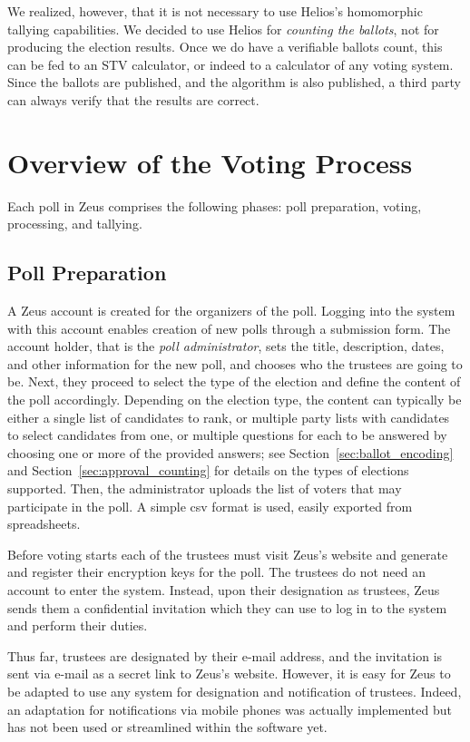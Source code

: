 \documentclass[letterpaper,10pt]{article}
\begin{document}
We realized, however, that it is not necessary to use Helios's
homomorphic tallying capabilities. We decided to use Helios for
\emph{counting the ballots}, not for producing the election results.
Once we do have a verifiable ballots count, this can be fed to an STV
calculator, or indeed to a calculator of any voting system. Since the
ballots are published, and the algorithm is also published, a third
party can always verify that the results are correct.

\section{Overview of the Voting Process}
\label{sec:voting_overview}

Each poll in Zeus comprises the following phases:
poll preparation, voting, processing, and tallying.

\subsection{Poll Preparation}
A Zeus account is created for the organizers of the poll.
Logging into the system with this account enables creation of new polls
through a submission form.
The account holder, that is the \emph{poll administrator},
sets the title, description, dates, and other information for the new
poll, and chooses who the trustees are going to be.
Next, they proceed to select the type of the election and define the
content of the poll accordingly.
Depending on the election type,
the content can typically be either a single list of candidates to rank,
or multiple party lists with candidates to select candidates from one,
or multiple questions for each to be answered by choosing one or more of
the provided answers; see Section~\ref{sec:ballot_encoding} 
and Section~\ref{sec:approval_counting} for details on the types of elections 
supported. Then, the administrator uploads the list of voters that may 
participate in the poll. A simple {\sc csv} format is used, easily 
exported from spreadsheets.

Before voting starts each of the trustees must visit Zeus's website
and generate and register their encryption keys for the poll.
The trustees do not need an account to enter the system.
Instead, upon their designation as trustees, Zeus sends them a
confidential invitation which they can use to log in to the system
and perform their duties.

Thus far, trustees are designated by their e-mail address, and the
invitation is sent via e-mail as a secret link to Zeus's website.
However, it is easy for Zeus to be adapted to use any system for
designation and notification of trustees. Indeed, an adaptation 
for notifications via mobile phones was actually implemented but
has not been used or streamlined within the software yet.
\end{document}
